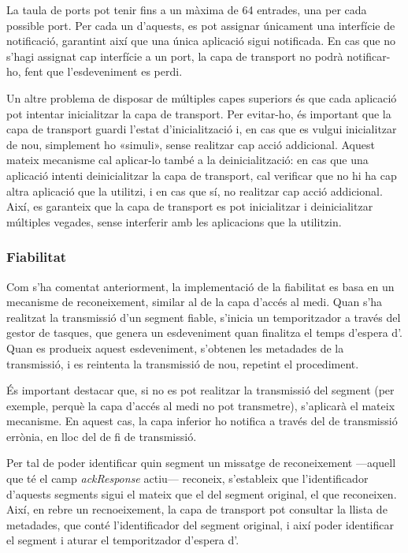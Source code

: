 \documentclass{tfgitic}[2024/07/01]
\begin{document}
{La taula de ports pot tenir fins a un màxima de 64 entrades, una per cada possible port. Per cada un d'aquests, es pot assignar únicament una interfície de notificació, garantint així que una única aplicació sigui notificada. En cas que no s'hagi assignat cap interfície a un port, la capa de transport no podrà notificar-ho, fent que l'esdeveniment es perdi.

Un altre problema de disposar de múltiples capes superiors és que cada aplicació pot intentar inicialitzar la capa de transport. Per evitar-ho, és important que la capa de transport guardi l'estat d'inicialització i, en cas que es vulgui inicialitzar de nou, simplement ho «simuli», sense realitzar cap acció addicional. Aquest mateix mecanisme cal aplicar-lo també a la deinicialització: en cas que una aplicació intenti deinicialitzar la capa de transport, cal verificar que no hi ha cap altra aplicació que la utilitzi, i en cas que sí, no realitzar cap acció addicional. Així, es garanteix que la capa de transport es pot inicialitzar i deinicialitzar múltiples vegades, sense interferir amb les aplicacions que la utilitzin.
\subsubsection{Fiabilitat}
\label{subsubsec:transport_fiabilitat}
Com s'ha comentat anteriorment, la implementació de la fiabilitat es basa en un mecanisme de reconeixement, similar al de la capa d'accés al medi.
Quan s'ha realitzat la transmissió d'un segment fiable, s'inicia un temporitzador a través del gestor de tasques, que genera un esdeveniment quan finalitza el temps d'espera d'. Quan es produeix aquest esdeveniment, s'obtenen les metadades de la transmissió, i es reintenta la transmissió de nou, repetint el procediment.

És important destacar que, si no es pot realitzar la transmissió del segment (per exemple, perquè la capa d'accés al medi no pot transmetre), s'aplicarà el mateix mecanisme. En aquest cas, la capa inferior ho notifica a través del  de transmissió errònia, en lloc del de fi de transmissió.

Per tal de poder identificar quin segment un missatge de reconeixement ---aquell que té el camp \emph{ackResponse} actiu--- reconeix, s'estableix que l'identificador d'aquests segments sigui el mateix que el del segment original, el que reconeixen. Així, en rebre un recnoeixement, la capa de transport pot consultar la llista de metadades, que conté l'identificador del segment original, i així poder identificar el segment i aturar el temporitzador d'espera d'.

}
\end{document}
